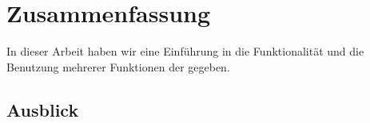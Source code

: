\section{Zusammenfassung}

In dieser Arbeit haben wir eine Einführung in die Funktionalität und die Benutzung mehrerer Funktionen der \naglib gegeben.


\subsection{Ausblick}

